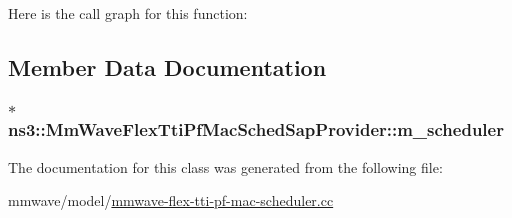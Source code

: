 Here is the call graph for this function\+:




\subsection{Member Data Documentation}
\subsubsection[{\texorpdfstring{m\+\_\+scheduler}{m_scheduler}}]{$\ast$ ns3\+::\+Mm\+Wave\+Flex\+Tti\+Pf\+Mac\+Sched\+Sap\+Provider\+::m\+\_\+scheduler\hspace{0.3cm}{\ttfamily [private]}}\hypertarget{classns3_1_1MmWaveFlexTtiPfMacSchedSapProvider_abf40ba0ffbc7dc64feaafdc47e57e5c9}{}\label{classns3_1_1MmWaveFlexTtiPfMacSchedSapProvider_abf40ba0ffbc7dc64feaafdc47e57e5c9}


The documentation for this class was generated from the following file\+:\begin{DoxyCompactItemize}
\item 
mmwave/model/\hyperlink{mmwave-flex-tti-pf-mac-scheduler_8cc}{mmwave-\/flex-\/tti-\/pf-\/mac-\/scheduler.\+cc}\end{DoxyCompactItemize}
